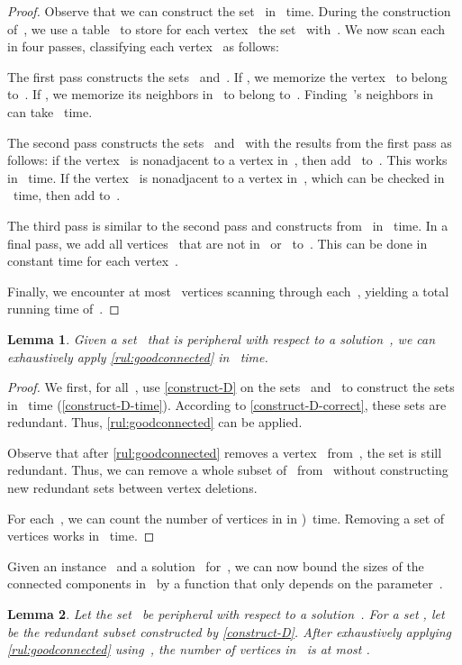\documentclass[12pt, a4paper, abstracton]{scrreprt}
\newcounter{theorem}
\newtheorem{lemma}{Lemma}[chapter]
\theoremstyle{definition}
\theoremstyle{remark}
\begin{document}
\begin{proof}
  Observe that we can construct the set~ in ~time. During the construction of~, we use a table~ to store for each vertex~ the set~ with~.  We now scan each~ in four passes, classifying each vertex~ as follows:

  The first pass constructs the sets~ and~. If , we memorize the vertex~ to belong to~. If , we memorize its neighbors in~ to belong to~. Finding~'s neighbors in~ can take~ time.

  The second pass constructs the sets~ and~ with the results from the first pass as follows: if the vertex~ is nonadjacent to a vertex in~, then add~ to~. This works in ~time.
If the vertex~ is nonadjacent to a vertex in~, which can be checked in ~time, then add  to~. 

  The third pass is similar to the second pass and constructs  from~ in ~time. In a final pass, we add all vertices~ that are not in~ or~ to~. This can be done in constant time for each vertex~.

  Finally, we encounter at most~ vertices scanning through each~, yielding a total running time of~.
\end{proof}

\begin{lemma}\label{goodconnected-time}
  Given a set~ that is peripheral with respect to a solution~, we can exhaustively apply \autoref{rul:goodconnected} in ~time.
\end{lemma}
\begin{proof}
  We first, for all~, use \autoref{construct-D} on the sets~ and~ to construct the sets~ in ~time (\autoref{construct-D-time}). According to \autoref{construct-D-correct}, these sets are redundant. Thus, \autoref{rul:goodconnected} can be applied.

  Observe that after \autoref{rul:goodconnected} removes a vertex~ from~, the set  is still redundant. Thus, we can remove a whole subset of~ from~ without constructing new redundant sets between vertex deletions.

  For each~, we can count the number of vertices in  in )~time. Removing a set of vertices works in ~time.
\end{proof}

\noindent Given an instance~ and a solution~ for~, we can now bound the sizes of the connected components in~ by a function that only depends on the parameter~.

\begin{lemma}\label{h1-vertices}
  Let the set~ be peripheral with respect to a solution~.  For a set , let~ be the redundant subset constructed by \autoref{construct-D}. After exhaustively applying \autoref{rul:goodconnected} using~, the number of vertices in~ is at most .
\end{lemma}
\end{document}
